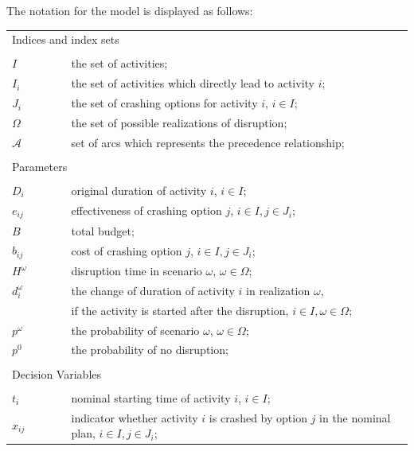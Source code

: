 \documentclass[11pt]{article}
\begin{document}
	\newline
	The notation for the model is displayed as follows:
	\begin{longtable}[H]{ l l l l }
		\multicolumn{4}{l}{Indices and index sets} \\
		\\
		\(I\) & \(\qquad\) & the set of activities;&\\
		\(I_i\) & \(\qquad\) & the set of activities which directly lead to activity \(i\); &\\
		\(J_i\) & \(\qquad\) & the set of crashing options for activity \(i\), \(i \in I\);&\\
		\(\Omega\) & \(\qquad\) & the set of possible realizations of disruption;&\\
		\(\mathcal{A}\) &\(\qquad\) & set of arcs which represents the precedence relationship;&\\
		\\
		\multicolumn{4}{l}{Parameters} \\
		\\
		\(D_{i}\)& \(\qquad\) & original duration of activity \(i\), \(i \in I\);&\\
		\(e_{ij}\) & \(\qquad\) & effectiveness of crashing option \(j\), \(i \in I, j \in J_i\);&\\
		\(B\) & \(\qquad\) & total budget;&\\
		\(b_{ij}\) & \(\qquad\) & cost of crashing option \(j\), \(i \in I, j \in J_i\);&\\
		\(H^\omega\) &\(\qquad\) & disruption time in scenario \(\omega\), \(\omega \in \Omega\);&\\
		\(d_{i}^\omega\) & \(\qquad\)&the change of duration of activity \(i\) in realization \(\omega\), &\\
		& \(\qquad\) & if the activity is started after the disruption, \(i \in I, \omega \in \Omega\);& \\
		\(p^\omega\) & \(\qquad\) & the probability of scenario \(\omega\), \(\omega \in \Omega\);& \\
		\(p^0\) & \(\qquad\) & the probability of no disruption;& \\
		\\
		\multicolumn{4}{l}{Decision Variables}\\
		\\
		\(t_{i}\) & \(\qquad\) & nominal starting time of activity \(i\), \(i \in I\);&\\
		\(x_{ij}\) & \(\qquad\) & indicator whether activity \(i\) is crashed by option \(j\) in the nominal plan, \(i \in I, j \in J_i\); &\\

\end{longtable}
\end{document}
